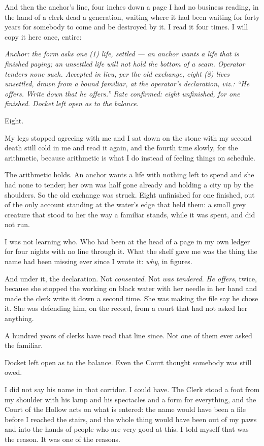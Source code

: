 And then the anchor's line, four inches down a page I had no business reading, in the hand of a clerk dead a generation, waiting where it had been waiting for forty years for somebody to come and be destroyed by it. I read it four times. I will copy it here once, entire:

\emph{Anchor: the form asks one (1) life, settled --- an anchor wants a life that is finished paying; an unsettled life will not hold the bottom of a seam. Operator tenders none such. Accepted in lieu, per the old exchange, eight (8) lives unsettled, drawn from a bound familiar, at the operator's declaration, viz.: ``He offers. Write down that he offers.'' Rate confirmed: eight unfinished, for one finished. Docket left open as to the balance.}

Eight.

My legs stopped agreeing with me and I sat down on the stone with my second death still cold in me and read it again, and the fourth time slowly, for the arithmetic, because arithmetic is what I do instead of feeling things on schedule.

The arithmetic holds. An anchor wants a life with nothing left to spend and she had none to tender; her own was half gone already and holding a city up by the shoulders. So the old exchange was struck. Eight unfinished for one finished, out of the only account standing at the water's edge that held them: a small grey creature that stood to her the way a familiar stands, while it was spent, and did not run.

I was not learning who. Who had been at the head of a page in my own ledger for four nights with no line through it. What the shelf gave me was the thing the name had been missing ever since I wrote it: \emph{why}, in figures.

And under it, the declaration. Not \emph{consented}. Not \emph{was tendered}. \emph{He offers}, twice, because she stopped the working on black water with her needle in her hand and made the clerk write it down a second time. She was making the file say he chose it. She was defending him, on the record, from a court that had not asked her anything.

A hundred years of clerks have read that line since. Not one of them ever asked the familiar.

Docket left open as to the balance. Even the Court thought somebody was still owed.

I did not say his name in that corridor. I could have. The Clerk stood a foot from my shoulder with his lamp and his spectacles and a form for everything, and the Court of the Hollow acts on what is entered: the name would have been a file before I reached the stairs, and the whole thing would have been out of my paws and into the hands of people who are very good at this. I told myself that was the reason. It was one of the reasons.

